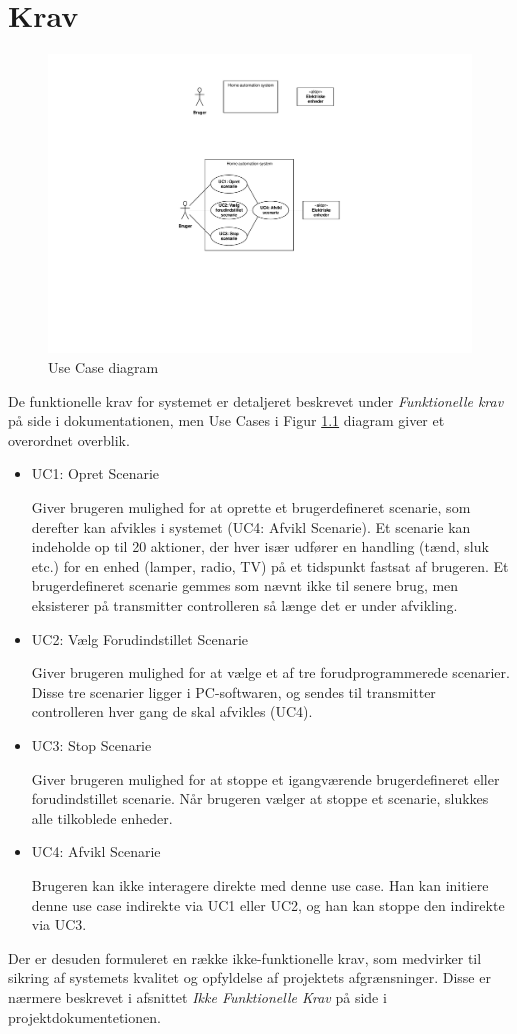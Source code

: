 \chapter{Krav}
\begin{figure}[h]
\centering 
\includegraphics[width=\textwidth, trim=190 200 230 200, clip=true] {../Projektdokumentation/Kravspecifikation/actor.pdf}
\caption{Use Case diagram}
\label{UC diagram}
\end{figure}
De funktionelle krav for systemet er detaljeret beskrevet under \textit{Funktionelle krav} på side \pageref{P-FunkKrav} i dokumentationen, men Use Cases i Figur \ref{UC diagram} diagram giver et overordnet overblik. 

\begin{itemize}
\item UC1: Opret Scenarie 

Giver brugeren mulighed for at oprette et brugerdefineret scenarie, som derefter kan afvikles i systemet (UC4: Afvikl Scenarie). Et scenarie kan indeholde op til 20 aktioner, der hver især udfører en handling (tænd, sluk etc.) for en enhed (lamper, radio, TV) på et tidspunkt fastsat af brugeren. Et brugerdefineret scenarie gemmes som nævnt ikke til senere brug, men eksisterer på transmitter controlleren så længe det er under afvikling. 

\item UC2: Vælg Forudindstillet Scenarie 

Giver brugeren mulighed for at vælge et af tre forudprogrammerede scenarier. Disse tre scenarier ligger i PC-softwaren, og sendes til transmitter controlleren hver gang de skal afvikles (UC4).

\item UC3: Stop Scenarie 

Giver brugeren mulighed for at stoppe et igangværende brugerdefineret eller forudindstillet scenarie. Når brugeren vælger at stoppe et scenarie, slukkes alle tilkoblede enheder.  

\item UC4: Afvikl Scenarie 

Brugeren kan ikke interagere direkte med denne use case. Han kan initiere denne use case indirekte via UC1 eller UC2, og han kan stoppe den indirekte via UC3. 
\end{itemize}

Der er desuden formuleret en række ikke-funktionelle krav, som medvirker til sikring af systemets kvalitet og opfyldelse af projektets afgrænsninger. Disse er nærmere beskrevet i afsnittet \textit{Ikke Funktionelle Krav} på side \pageref{P-ikkeFunkKrav} i projektdokumentetionen.
\clearpage